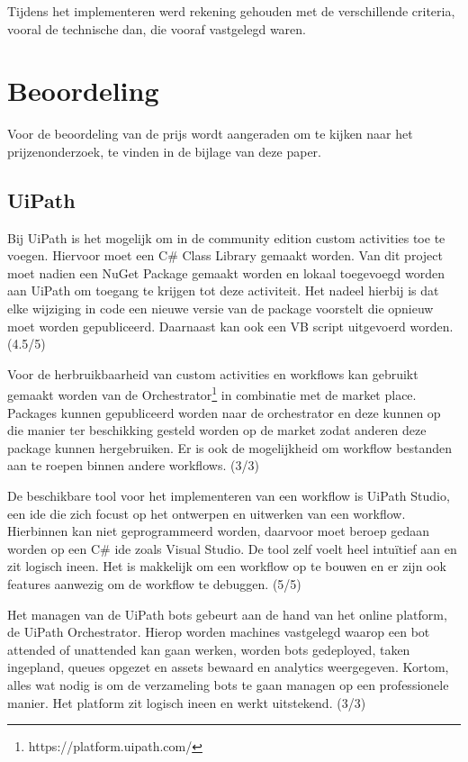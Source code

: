 Tijdens het implementeren werd rekening gehouden met de verschillende criteria, vooral de technische dan, die vooraf vastgelegd waren.

\section{Beoordeling}
Voor de beoordeling van de prijs wordt aangeraden om te kijken naar het prijzenonderzoek, te vinden in de bijlage van deze paper.

\subsection{UiPath}
Bij UiPath is het mogelijk om in de community edition custom activities toe te voegen. Hiervoor moet een C\# Class Library gemaakt worden. Van dit project moet nadien een NuGet Package gemaakt worden en lokaal toegevoegd worden aan UiPath om toegang te krijgen tot deze \gls{activiteit}. Het nadeel hierbij is dat elke wijziging in code een nieuwe versie van de package voorstelt die opnieuw moet worden gepubliceerd. Daarnaast kan ook een VB script uitgevoerd worden. (4.5/5)

Voor de herbruikbaarheid van custom activities en \gls{workflow}s kan gebruikt gemaakt worden van de Orchestrator\footnote{https://platform.uipath.com/} in combinatie met de market place. Packages kunnen gepubliceerd worden naar de orchestrator en deze kunnen op die manier ter beschikking gesteld worden op de market zodat anderen deze package kunnen hergebruiken. Er is ook de mogelijkheid om \gls{workflow} bestanden aan te roepen binnen andere \gls{workflow}s. (3/3) 

De beschikbare tool voor het implementeren van een \gls{workflow} is UiPath Studio, een \acrfull{ide} die zich focust op het ontwerpen en uitwerken van een \gls{workflow}. Hierbinnen kan niet geprogrammeerd worden, daarvoor moet beroep gedaan worden op een C\# \acrshort{ide} zoals Visual Studio. De tool zelf voelt heel intuïtief aan en zit logisch ineen. Het is makkelijk om een \gls{workflow} op te bouwen en er zijn ook features aanwezig om de \gls{workflow} te debuggen. (5/5)

Het managen van de UiPath bots gebeurt aan de hand van het online platform, de UiPath Orchestrator. Hierop worden machines vastgelegd waarop een bot attended of unattended kan gaan werken, worden bots gedeployed, taken ingepland, queues opgezet en assets bewaard en analytics weergegeven. Kortom, alles wat nodig is om de verzameling bots te gaan managen op een professionele manier. Het platform zit logisch ineen en werkt uitstekend. (3/3)

